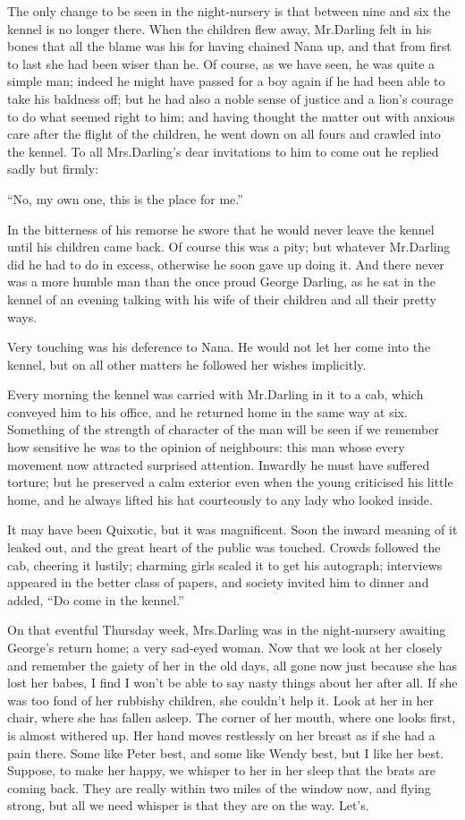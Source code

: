 The only change to be seen in the night‐nursery is that
between nine and six the kennel is no longer there.
When the children flew away,
Mr.\@ Darling felt in his bones that all the blame was his for having chained Nana up,
and that from first to last she had been wiser than he.
Of course, as we have seen, he was quite a simple man;
indeed he might have passed for a boy again if he had been able to take his baldness off;
but he had also a noble sense of justice and a lion’s courage to do what seemed right to him;
and having thought the matter out with anxious care after the flight of the children,
he went down on all fours and crawled into the kennel.
To all Mrs.\@ Darling’s dear invitations to him to come out he replied sadly but firmly:

“No, my own one, this is the place for me.”

In the bitterness of his remorse he swore that he would never leave the kennel until his children came back.
Of course this was a pity;
but whatever Mr.\@ Darling did he had to do in excess,
otherwise he soon gave up doing it.
And there never was a more humble man than the once proud George Darling,
as he sat in the kennel of an evening talking with his wife of their children and all their pretty ways.

Very touching was his deference to Nana.
He would not let her come into the kennel,
but on all other matters he followed her wishes implicitly.

Every morning the kennel was carried with Mr.\@ Darling in it to a cab,
which conveyed him to his office, and he returned home in the same way at six.
Something of the strength of character of the man will be seen
if we remember how sensitive he was to the opinion of neighbours:
this man whose every movement now attracted surprised attention.
Inwardly he must have suffered torture;
but he preserved a calm exterior even when the young criticised his little home,
and he always lifted his hat courteously to any lady who looked inside.

It may have been Quixotic, but it was magnificent.
Soon the inward meaning of it leaked out,
and the great heart of the public was touched.
Crowds followed the cab, cheering it lustily;
charming girls scaled it to get his autograph;
interviews appeared in the better class of papers,
and society invited him to dinner and added, “Do come in the kennel.”

On that eventful Thursday week,
Mrs.\@ Darling was in the night‐nursery awaiting George’s return home;
a very sad‐eyed woman.
Now that we look at her closely and remember the gaiety of her in the old days,
all gone now just because she has lost her babes,
I find I won’t be able to say nasty things about her after all.
If she was too fond of her rubbishy children, she couldn’t help it.
Look at her in her chair, where she has fallen asleep.
The corner of her mouth, where one looks first, is almost withered up.
Her hand moves restlessly on her breast as if she had a pain there.
Some like Peter best, and some like Wendy best, but I like her best.
Suppose, to make her happy, we whisper to her in her sleep that the brats are coming back.
They are really within two miles of the window now, and flying strong,
but all we need whisper is that they are on the way.
Let’s.

